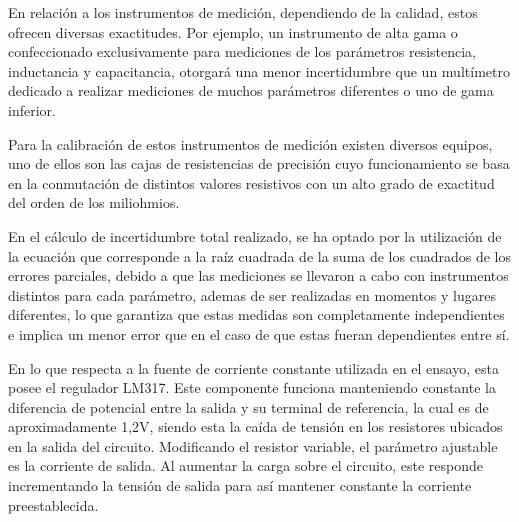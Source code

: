 En relación a los instrumentos de medición, dependiendo de la calidad, estos ofrecen diversas exactitudes.
Por ejemplo, un instrumento de alta gama o confeccionado exclusivamente para mediciones de los parámetros resistencia, inductancia y capacitancia, otorgará una menor incertidumbre que un multímetro dedicado a realizar mediciones de muchos parámetros diferentes o uno de gama inferior.

Para la calibración de estos instrumentos de medición existen diversos equipos, uno de ellos son las cajas de resistencias de precisión cuyo funcionamiento se basa en la conmutación de distintos valores resistivos con un alto grado de exactitud del orden de los miliohmios.

En el cálculo de incertidumbre total realizado, se ha optado por la utilización de la ecuación que corresponde a la raíz cuadrada de la suma de los cuadrados de los errores parciales, debido a que las mediciones se llevaron a cabo con instrumentos distintos para cada parámetro, ademas de ser realizadas en momentos y lugares diferentes, lo que garantiza que estas medidas son completamente independientes e implica un menor error que en el caso de que estas fueran dependientes entre sí.

En lo que respecta a la fuente de corriente constante utilizada en el ensayo, esta posee el regulador LM317.
Este componente funciona manteniendo constante la diferencia de potencial entre la salida y su terminal de referencia, la cual es de aproximadamente 1,2V, siendo esta la caída de tensión en los resistores ubicados en la salida del circuito.
Modificando el resistor variable, el parámetro ajustable es la corriente de salida.
Al aumentar la carga sobre el circuito, este responde incrementando la tensión de salida para así mantener constante la corriente preestablecida.
